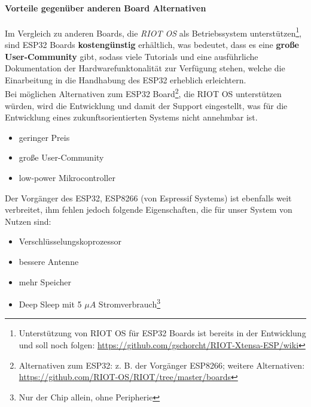 \documentclass[a4paper,10pt,twocolumn]{article}
\begin{document}
\paragraph{Vorteile gegenüber anderen Board Alternativen} Im Vergleich zu anderen Boards, die \textit{RIOT OS} als Betriebssystem unterstützen\footnote{Unterstützung von RIOT OS für ESP32 Boards ist bereits in der Entwicklung und soll noch folgen: \url{https://github.com/gschorcht/RIOT-Xtensa-ESP/wiki}}, sind ESP32 Boards \textbf{kostengünstig} erhältlich, was bedeutet, dass es eine \textbf{große User-Community} gibt, sodass viele Tutorials und eine ausführliche Dokumentation der Hardwarefunktonalität zur Verfügung stehen, welche die Einarbeitung in die Handhabung des ESP32 erheblich erleichtern.\\
Bei möglichen Alternativen zum ESP32 Board\footnote{Alternativen zum ESP32: z. B. der Vorgänger ESP8266; weitere Alternativen: \url{https://github.com/RIOT-OS/RIOT/tree/master/boards}}, die RIOT OS unterstützen würden, wird die Entwicklung und damit der Support eingestellt, was für die Entwicklung eines zukunftsorientierten Systems nicht annehmbar ist. 

\begin{itemize}
    \item geringer Preis
    \item große User-Community
    \item low-power Mikrocontroller
\end{itemize}
Der Vorgänger des ESP32, ESP8266 (von Espressif Systems) ist ebenfalls weit verbreitet, ihm fehlen jedoch folgende Eigenschaften, die für unser System von Nutzen sind: 

\begin{itemize}
    \item Verschlüsselungskoprozessor
    \item bessere Antenne
    \item mehr Speicher
    \item Deep Sleep mit 5 $\mu A$ Stromverbrauch\footnote{Nur der Chip allein, ohne Peripherie}
\end{itemize}
\end{document}
